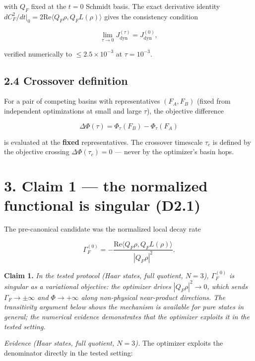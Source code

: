 \documentclass[
]{article}
\begin{document}
with \(Q_F\) fixed at the \(t=0\) Schmidt basis. The exact derivative
identity
\(dC_F^2/dt\big|_0 = 2\mathrm{Re}\langle Q_F\rho, Q_FL(\rho)\rangle\)
gives the consistency condition

\[\lim_{\tau\to 0} J_{\mathrm{dyn}}^{(\tau)} = J_{\mathrm{dyn}}^{(0)},\]

verified numerically to \(\le 2.5\times10^{-3}\) at \(\tau = 10^{-3}\).

\subsection{2.4 Crossover definition}\label{crossover-definition}

For a pair of competing basins with representatives \((F_A, F_B)\)
(fixed from independent optimizations at small and large \(\tau\)), the
objective difference

\[\Delta\Phi(\tau) = \Phi_\tau(F_B) - \Phi_\tau(F_A)\]

is evaluated at the \textbf{fixed} representatives. The crossover
timescale \(\tau_c\) is defined by the objective crossing
\(\Delta\Phi(\tau_c) = 0\) --- never by the optimizer's basin hops.

\section{3. Claim 1 --- the normalized functional is singular
(D2.1)}\label{claim-1-the-normalized-functional-is-singular-d2.1}

The pre-canonical candidate was the normalized local decay rate

\[\Gamma_F^{(0)} = -\frac{\mathrm{Re}\langle Q_F\rho, Q_FL(\rho)\rangle}
{|Q_F\rho|^2}.\]

\textbf{Claim 1.} \emph{In the tested protocol (Haar states, full
quotient, \(N=3\)), \(\Gamma_F^{(0)}\) is singular as a variational
objective: the optimizer drives \(|Q_F\rho|^2 \to 0\), which sends
\(\Gamma_F \to \pm\infty\) and \(\Phi \to +\infty\) along non-physical
near-product directions. The transitivity argument below shows the
mechanism is available for pure states in general; the numerical
evidence demonstrates that the optimizer exploits it in the tested
setting.}

\emph{Evidence (Haar states, full quotient, \(N=3\)).} The optimizer
exploits the denominator directly in the tested setting:
\end{document}
